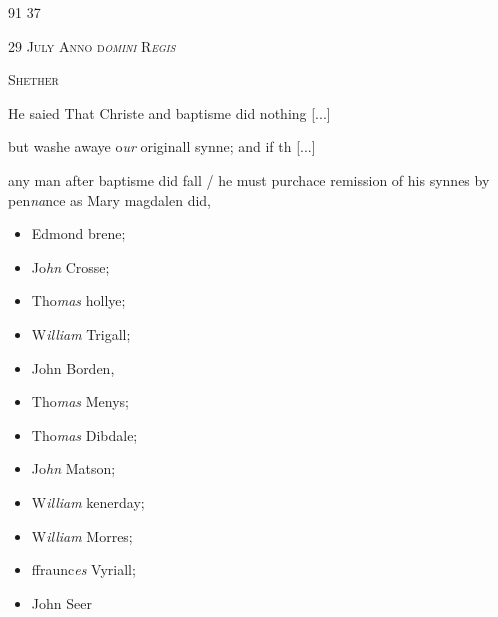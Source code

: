 \documentclass[12pt, a4paper]{book}
\begin{document}
\begin{flushright}{\color{Mahogany}91} 37\end{flushright}
 

               
				\begin{center} \begin{large} {\scshape 
                  29 July Anno d\textit{omini} R\textit{egis}
                  
               } \end{large} \end{center}
			
               
                  
				\begin{center}  {\scshape Shether}  \end{center}
			
               	
				\marginpar[\vspace{0.5cm}{\textcolor{Gray}{n}}]{}
			 
		\ifthenelse{\isodd{\thepage}}
		{\reversemarginpar}
		{\normalmarginpar}
		He saied That Christe and baptisme did nothing 
				[...]
			
                  
 but washe awaye o\textit{ur} originall synne; and if th
				[...]
			
  any man after baptisme did fall / he must
 purchace remission of his synnes by pen\textit{na}nce as
               		Mary magdalen did,

	
		\begin{itemize}
			\item[]Edmond brene;
			\item[]Jo\textit{hn} Crosse;
			\item[]Tho\textit{mas} hollye;
			\item[]W\textit{illiam} Trigall;
			\item[]John Borden,
			\item[]Tho\textit{mas} Menys;
			\item[]Tho\textit{mas} Dibdale;
			\item[]Jo\textit{hn} Matson;
			\item[]W\textit{illiam} kenerday;
			\item[]W\textit{illiam} Morres;
			\item[]ffraunc\textit{es} Vyriall;
			\item[]John Seer
		\end{itemize}
		
\end{document}
